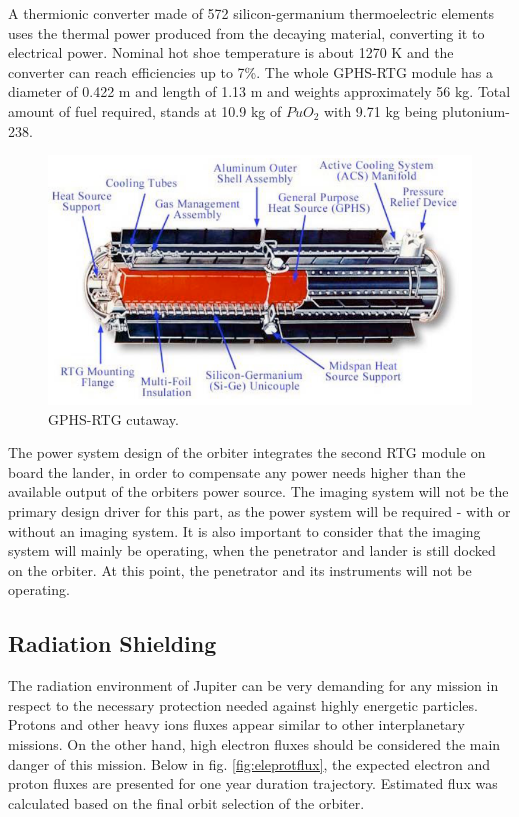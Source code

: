 A thermionic converter made of 572 silicon-germanium thermoelectric elements uses the thermal power produced from the decaying material, converting it to electrical power. Nominal hot shoe temperature is about 1270 K and the converter can reach efficiencies up to 7\%. The whole GPHS-RTG module has a diameter of 0.422 m and length of 1.13 m and weights approximately 56 kg. Total amount of fuel required, stands at 10.9 kg of $PuO_2$ with 9.71 kg being plutonium-238.

\begin{figure}[htb]
\centering
\includegraphics[scale=0.6]{figures/Orbiter/rtg.png}
\caption{GPHS-RTG cutaway. \cite{rtg}}
\label{fig:rtg}
\end{figure}

The power system design of the orbiter integrates the second RTG module on board the lander, in order to compensate any power needs higher than the available output of the orbiters power source. The imaging system will not be the primary design driver for this part, as the power system will be required - with or without an imaging system. It is also important to consider that the imaging system will mainly be operating, when the penetrator and lander is still docked on the orbiter. At this point, the penetrator and its instruments will not be operating.
\subsection{Radiation Shielding}
The radiation environment of Jupiter can be very demanding for any mission in respect to the necessary protection needed against highly energetic particles. Protons and other heavy ions fluxes appear similar to other interplanetary missions. On the other hand, high electron fluxes should be considered the main danger of this mission.
Below in fig. \ref{fig:eleprotflux}, the expected electron and proton fluxes are presented for one year duration trajectory. Estimated flux was calculated based on the final orbit selection of the orbiter.

